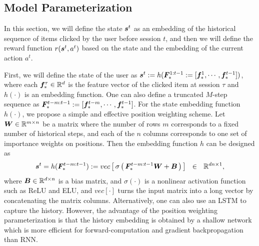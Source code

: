 \documentclass{article} %
\begin{document}
\vspace{-3mm}
\subsection{Model Parameterization}
\label{sec:model_param}
\vspace{-2mm}

In this section, we will define the state ${\bm{s}}^t$ as an embedding of the historical sequence of items clicked by the user before session $t$, and then we will define the reward function $r({\bm{s}}^t, a^t)$ based on the state and the embedding of the current action $a^t$.

First, we will define the state of the user as $\vs^t := h({\small \mF_\ast^{1:t-1} := [ \vf_\ast^{1},\cdots,\vf_\ast^{t-1} ]})$, where each ${\bm{f}}_\ast^\tau \in {\mathbb{R}}^d$ is the feature vector of the clicked item at session $\tau$ and $h(\cdot)$ is an embedding function. One can also define a truncated $M$-step sequence as {\small ${\bm{F}}^{t-m:t-1}_\ast:=[{\bm{f}}_\ast^{t-m},\cdots,{\bm{f}}_\ast^{t-1}]$}. 
For the state embedding function $h(\cdot)$, we propose a simple and effective position weighting scheme. Let {\small${\bm{W}} \in {\mathbb{R}}^{m\times n}$} be a matrix where the number of rows $m$ corresponds to a fixed number of historical steps, and each of the $n$ columns corresponds to one set of importance weights on positions. Then the embedding function $h$ can be designed as 
\begin{equation}
    \label{eq:state_embedding}
    {\bm{s}}^t = h({\bm{F}}^{t-m:t-1}_\ast) := vec \left[\, \sigma \left(\, {\bm{F}}_*^{t-m:t-1} {\bm{W}} + {\bm{B}} \,\right)\, \right]~~\in~~{\mathbb{R}}^{dn\times 1}, 
\end{equation}
where ${\bm{B}}\in {\mathbb{R}}^{d\times n}$ is a bias matrix, and $\sigma(\cdot)$ is a nonlinear activation function such as ReLU and ELU, and $vec[\cdot]$ turns the input matrix into a long vector by concatenating the matrix columns.
Alternatively, one can also use an {\small LSTM} to capture the history. However, the advantage of the position weighting parameterization is that the history embedding is obtained by a shallow network which is more efficient for forward-computation and gradient backpropagation than RNN. 
\end{document}
